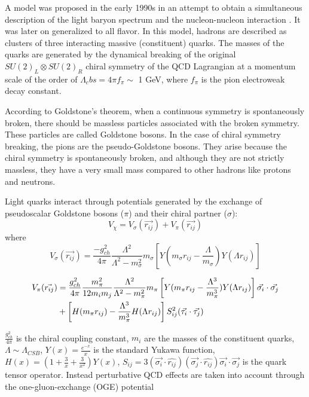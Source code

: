 \documentclass[12pt,a4paper]{book}
\begin{document}
	A model was proposed in the early 1990s in an attempt to obtain a simultaneous
	description of the light baryon spectrum and the nucleon-nucleon interaction \cite{Valcarce_2005}. It was later on generalized to all flavor. In this model, hadrons are described as clusters of three interacting massive (constituent) quarks. The masses of the quarks are generated by the dynamical breaking of the original $SU(2)_L \otimes SU(2)_R$ chiral symmetry of the QCD Lagrangian at a momentum scale of the order of $\Lambda_cbs= 4 \pi f_\pi \sim $ 1 GeV, where $f_\pi$ is the pion electroweak decay constant. 
	
	According to Goldstone's theorem, when a continuous symmetry is spontaneously broken, there should be massless particles associated with the broken symmetry. These particles are called Goldstone bosons. In the case of chiral symmetry breaking, the pions are the pseudo-Goldstone bosons. They arise because the chiral symmetry is spontaneously broken, and although they are not strictly massless, they have a very small mass compared to other hadrons like protons and neutrons. \cite{Smit_2023}
	
	Light quarks interact through potentials generated by the exchange of pseudoscalar Goldstone bosons ($\pi$) and their chiral partner ($\sigma$):
	\begin{equation}
		V_\chi = V_\sigma(\vec{r_{ij}}) +V_\pi (\vec{r_{ij}})
	\end{equation}
	where 
	\begin{equation}
		V_\sigma(\vec{r_{ij}})= \frac{-g_{ch}^2}{4\pi} \frac{\Lambda^2}{\Lambda^2-m_\sigma^2} m_\sigma \left[ Y(m_\sigma r_{ij}- \frac{\Lambda}{m_\sigma}) Y(\Lambda r_{ij}) \right]
		\label{eq:sigma-potential}
	\end{equation}
	
	\begin{align}
		V_\pi(\vec{r_{ij}}) &= \frac{g_{ch}^2}{4\pi} \frac{m_\pi^2}{12 m_i m_j} \frac{\Lambda^2}{\Lambda^2 - m_\pi^2} m_\pi \left[ Y(m_\pi r_{ij} - \frac{\Lambda^3}{m_\pi^3}) Y(\Lambda r_{ij}) \right] \vec{\sigma_i} \cdot \vec{\sigma_j} \notag \\
		&+ \left[ H(m_\pi r_{ij}) - \frac{\Lambda^3}{m_\pi^3} H(\Lambda r_{ij}) \right] S_{ij}^2 (\vec{\tau_i} \cdot \vec{\tau_j})
		\label{eq:pi-potential}
	\end{align}
	
	
	$\frac{g_{ch}^2}{4\pi}$ is the chiral coupling constant, $m_i$ are the masses of the constituent quarks, $\Lambda \sim \Lambda_{CSB}$, $Y(x)= \frac{e^{-x}}{x}$ is the standard Yukawa function, $H(x)= (1 + \frac{3}{x} + \frac{3}{x^2}) Y(x)$, $S_{ij}=3(\vec{\sigma_i} \cdot \hat{r_{ij}}) (\vec{\sigma_j} \cdot \hat{r_{ij}}) \vec{\sigma_i} \cdot \vec{\sigma_j}$ is the quark tensor operator. Instead perturbative QCD effects are taken into account through the one-gluon-exchange (OGE) potential
	
\end{document}
